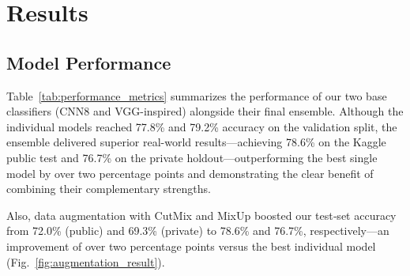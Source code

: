 \section{Results}

\subsection{Model Performance}

Table~\ref{tab:performance_metrics} summarizes the performance of our two base classifiers (CNN8 and VGG-inspired) alongside their final ensemble. Although the individual models reached 77.8\% and 79.2\% accuracy on the validation split, the ensemble delivered superior real-world results---achieving 78.6\% on the Kaggle public test and 76.7\% on the private holdout---outperforming the best single model by over two percentage points and demonstrating the clear benefit of combining their complementary strengths.

\begin{table}[h!]
\centering
\caption{Comparative performance of the baseline CNN8, VGG-inspired model, and their final ensemble.}
\label{tab:performance_metrics}
\end{table}

Also, data augmentation with CutMix and MixUp boosted our test‐set accuracy from 72.0\% (public) and 69.3\% (private) to 78.6\% and 76.7\%, respectively---an improvement of over two percentage points versus the best individual model (Fig.~\ref{fig:augmentation_result}).

